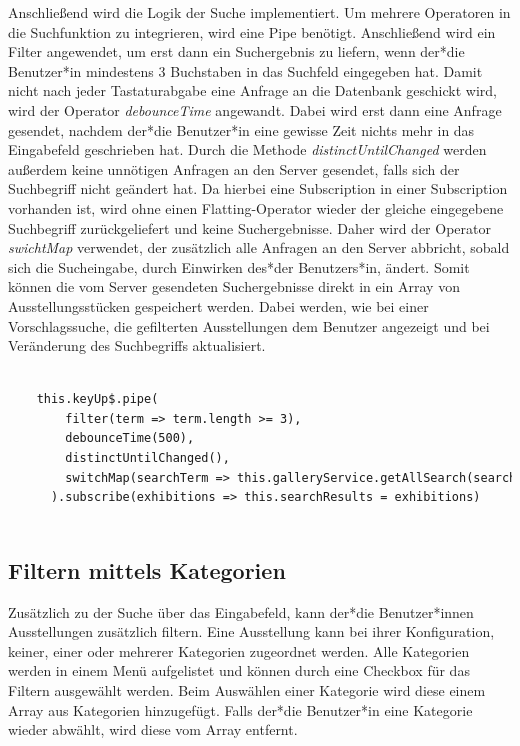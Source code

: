 Anschließend wird die Logik der Suche implementiert. Um mehrere Operatoren in die Suchfunktion zu integrieren, wird eine Pipe benötigt. Anschließend wird ein Filter angewendet, um erst dann ein Suchergebnis zu liefern, wenn der*die Benutzer*in mindestens 3 Buchstaben in das Suchfeld eingegeben hat. Damit nicht nach jeder Tastaturabgabe eine Anfrage an die Datenbank geschickt wird, wird der Operator \emph{debounceTime} angewandt. Dabei wird erst dann eine Anfrage gesendet, nachdem der*die Benutzer*in eine gewisse Zeit nichts mehr in das Eingabefeld geschrieben hat. Durch die Methode \emph{distinctUntilChanged} werden außerdem keine unnötigen Anfragen an den Server gesendet, falls sich der Suchbegriff nicht geändert hat. Da hierbei eine Subscription in einer Subscription vorhanden ist, wird ohne einen Flatting-Operator wieder der gleiche eingegebene Suchbegriff zurückgeliefert und keine Suchergebnisse. Daher wird der Operator \emph{swichtMap} verwendet, der zusätzlich alle Anfragen an den Server abbricht, sobald sich die Sucheingabe, durch Einwirken des*der Benutzers*in, ändert. Somit können die vom Server gesendeten Suchergebnisse direkt in ein Array von Ausstellungsstücken gespeichert werden. Dabei werden, wie bei einer Vorschlagssuche, die gefilterten Ausstellungen dem Benutzer angezeigt und bei Veränderung des Suchbegriffs aktualisiert.

\begin{lstlisting}[caption={Die Such-Pipe mit den Filter-Operatoren},language=HTML]

    this.keyUp$.pipe(
        filter(term => term.length >= 3),
        debounceTime(500),
        distinctUntilChanged(),
        switchMap(searchTerm => this.galleryService.getAllSearch(searchTerm)),
      ).subscribe(exhibitions => this.searchResults = exhibitions)
        
\end{lstlisting}

\subsection{Filtern mittels Kategorien}

Zusätzlich zu der Suche über das Eingabefeld, kann der*die Benutzer*innen Ausstellungen zusätzlich filtern. Eine Ausstellung kann bei ihrer Konfiguration, keiner, einer oder mehrerer Kategorien zugeordnet werden. Alle Kategorien werden in einem Menü aufgelistet und können durch eine Checkbox für das Filtern ausgewählt werden. Beim Auswählen einer Kategorie wird diese einem Array aus Kategorien hinzugefügt. Falls der*die Benutzer*in eine Kategorie wieder abwählt, wird diese vom Array entfernt.   


